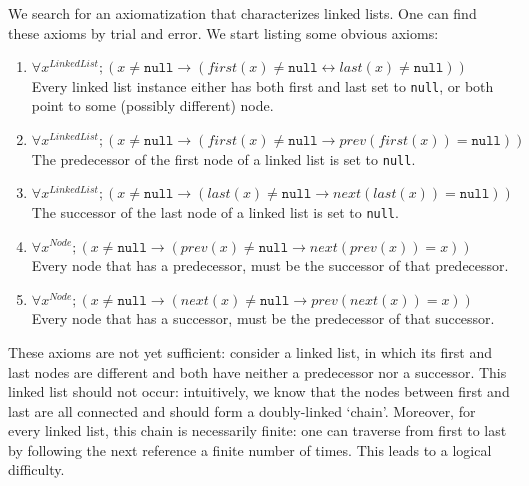 \documentclass[runningheads]{llncs}
\theoremstyle{remark}
\begin{document}
We search for an axiomatization that characterizes linked lists. One can find these axioms by trial and error. We start listing some obvious axioms:

\begin{enumerate}
    \item $\forall x^\mathit{LinkedList}; (x \neq \mathtt{null} \to (\mathit{first}(x) \neq \mathtt{null} \leftrightarrow \mathit{last}(x) \neq \mathtt{null}))$\\
    Every linked list instance either has both first and last set to \texttt{null}, or both point to some (possibly different) node.
    \item $\forall x^\mathit{LinkedList}; (x \neq \mathtt{null} \to (\mathit{first}(x) \neq \mathtt{null} \to \mathit{prev}(\mathit{first}(x)) = \mathtt{null}))$\\
    The predecessor of the first node of a linked list is set to \texttt{null}.
    \item\label{item:axiom-last} $\forall x^\mathit{LinkedList}; (x \neq \mathtt{null} \to (\mathit{last}(x) \neq \mathtt{null} \to \mathit{next}(\mathit{last}(x)) = \mathtt{null}))$\\
    The successor of the last node of a linked list is set to \texttt{null}.
    \item\label{item:axiom-pred} $\forall x^\mathit{Node}; (x \neq \mathtt{null} \to (\mathit{prev}(x) \neq \mathtt{null} \to \mathit{next}(\mathit{prev}(x)) = x))$\\
    Every node that has a predecessor, must be the successor of that predecessor.
    \item\label{item:axiom-succ} $\forall x^\mathit{Node}; (x \neq \mathtt{null} \to (\mathit{next}(x) \neq \mathtt{null} \to \mathit{prev}(\mathit{next}(x)) = x))$\\
    Every node that has a successor, must be the predecessor of that successor.
\end{enumerate}

These axioms are not yet sufficient: consider a linked list, in which its first and last nodes are different and both have neither a predecessor nor a successor. This linked list should not occur: intuitively, we know that the nodes between first and last are all connected and should form a doubly-linked `chain'. Moreover, for every linked list, this chain is necessarily finite: one can traverse from first to last by following the next reference a finite number of times. This leads to a logical difficulty.
\end{document}
